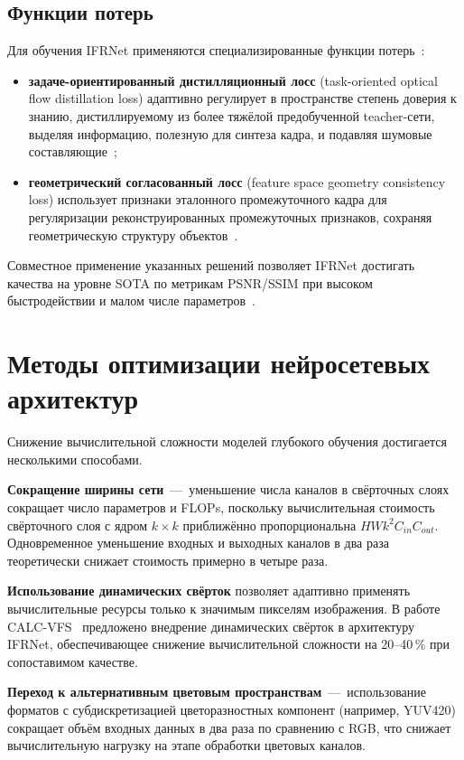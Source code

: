 \subsection*{Функции потерь}

Для обучения IFRNet применяются специализированные функции потерь~\cite{IFRNet2022}:

\begin{itemize}
	\item \textbf{задаче-ориентированный дистилляционный лосс} (task-oriented optical flow distillation loss) адаптивно регулирует в пространстве степень доверия к знанию, дистиллируемому из более тяжёлой предобученной teacher-сети, выделяя информацию, полезную для синтеза кадра, и подавляя шумовые составляющие~\cite{IFRNet2022};
	\item \textbf{геометрический согласованный лосс} (feature space geometry consistency loss) использует признаки эталонного промежуточного кадра для регуляризации реконструированных промежуточных признаков, сохраняя геометрическую структуру объектов~\cite{IFRNet2022}.
\end{itemize}

Совместное применение указанных решений позволяет IFRNet достигать качества на уровне SOTA по метрикам PSNR/SSIM при высоком быстродействии и малом числе параметров~\cite{IFRNet2022}.

\section{Методы оптимизации нейросетевых архитектур}

Снижение вычислительной сложности моделей глубокого обучения достигается несколькими способами.

\textbf{Сокращение ширины сети}~---~уменьшение числа каналов в свёрточных слоях сокращает число параметров и FLOPs, поскольку вычислительная стоимость свёрточного слоя с ядром $k \times k$ приближённо пропорциональна $H W k^2 C_{in} C_{out}$. Одновременное уменьшение входных и выходных каналов в два раза теоретически снижает стоимость примерно в четыре раза.

\textbf{Использование динамических свёрток} позволяет адаптивно применять вычислительные ресурсы только к значимым пикселям изображения. В работе CALC-VFS~\cite{giuliani2023calc} предложено внедрение динамических свёрток в архитектуру IFRNet, обеспечивающее снижение вычислительной сложности на 20--40\,\% при сопоставимом качестве.

\textbf{Переход к альтернативным цветовым пространствам}~---~использование форматов с субдискретизацией цветоразностных компонент (например, YUV420) сокращает объём входных данных в два раза по сравнению с RGB, что снижает вычислительную нагрузку на этапе обработки цветовых каналов.


